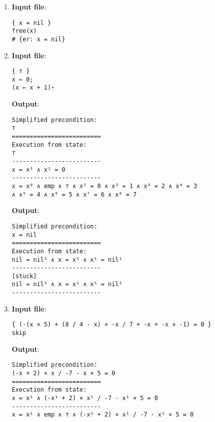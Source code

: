 \documentclass[parskip=half]{scrartcl}
\begin{document}
\begin{enumerate}
\textbf{Output}: 
\begin{verbatim}
Simplified precondition:
y ↦̸
=========================
Execution from state:
y¹ ↦̸ ∧ y = y¹ ∧ ⊤
-------------------------
x = y¹ ∧ y = y¹ ∧ y¹ ↦ _ ∧ ⊤
\end{verbatim}

\item 
\textbf{Input file}: 
\begin{verbatim}
{ x = nil }
free(x)
# {er: x = nil}
\end{verbatim}

\item 
\textbf{Input file}: 
\begin{verbatim}
{ ⊤ }
x ← 0;
(x ← x + 1)⋆
\end{verbatim}

\textbf{Output}: 
\begin{verbatim}
Simplified precondition:
⊤
=========================
Execution from state:
⊤
-------------------------
x = x¹ ∧ x¹ = 0
-------------------------
x = x⁸ ∧ emp ∧ ⊤ ∧ x¹ = 0 ∧ x² = 1 ∧ x³ = 2 ∧ x⁴ = 3 
∧ x⁵ = 4 ∧ x⁶ = 5 ∧ x⁷ = 6 ∧ x⁸ = 7
\end{verbatim}

\textbf{Output}: 
\begin{verbatim}
Simplified precondition:
x = nil
=========================
Execution from state:
nil = nil¹ ∧ x = x¹ ∧ x¹ = nil¹
-------------------------
[stuck]
nil = nil¹ ∧ x = x¹ ∧ x¹ = nil¹
-------------------------
\end{verbatim}

\item 
\textbf{Input file}: 
\begin{verbatim}
{ (-(x × 5) + (8 / 4 - x) × -x / 7 + -x + -x × -1) = 0 }
skip
\end{verbatim}

\textbf{Output}: 
\begin{verbatim}
Simplified precondition:
(-x + 2) × x / -7 - x × 5 = 0
=========================
Execution from state:
x = x¹ ∧ (-x¹ + 2) × x¹ / -7 - x¹ × 5 = 0
-------------------------
x = x¹ ∧ emp ∧ ⊤ ∧ (-x¹ + 2) × x¹ / -7 - x¹ × 5 = 0
\end{verbatim}

\end{enumerate}
\end{document}
